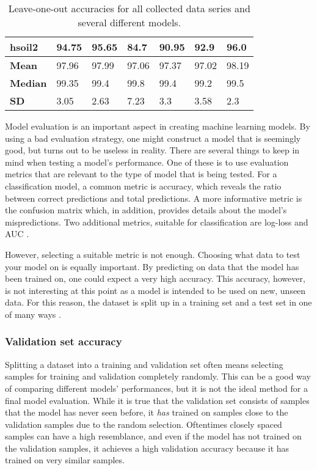 \begin{table}
\begin{center}
\begin{adjustbox}{totalheight=\baselineskip}
\begin{tabular}{|l|l|l|l|l|l|l|}
		hsoil2 & \cellcolor{red!20}94.75 & 95.65 & \cellcolor{red!20}84.7 & \cellcolor{red!20}90.95 & \cellcolor{red!20}92.9 & 96.0\\
		\hline
		\textbf{Mean} & 97.96 & 97.99 & 97.06 & 97.37 & 97.02 & \cellcolor{green!20}98.19\\
		\textbf{Median} & 99.35 & 99.4 &\cellcolor{green!20} 99.8 & 99.4 & 99.2 & 99.5\\
		\textbf{SD} & 3.05 & 2.63 & 7.23 & 3.3 & 3.58 & \cellcolor{green!20}2.3\\
		\hline
		\end{tabular}
	\end{adjustbox}
	\end{center}
	\label{tab:loo}
	\caption{Leave-one-out accuracies for all collected data series and several different models.}
\end{table}

Model evaluation is an important aspect in creating machine learning models. By using a bad evaluation strategy, one might construct a model that is seemingly good, but turns out to be useless in reality. There are several things to keep in mind when testing a model's performance. One of these is to use evaluation metrics that are relevant to the type of model that is being tested. For a classification model, a common metric is accuracy, which reveals the ratio between correct predictions and total predictions. A more informative metric is the confusion matrix which, in addition, provides details about the model's mispredictions. Two additional metrics, suitable for classification are log-loss and AUC \citep{zheng_2015}. 

However, selecting a suitable metric is not enough. Choosing what data to test your model on is equally important. By predicting on data that the model has been trained on, one could expect a very high accuracy. This accuracy, however, is not interesting at this point as a model is intended to be used on new, unseen data. For this reason, the dataset is split up in a training set and a test set in one of many ways \citep{raschka}.


\subsubsection{Validation set accuracy}
Splitting a dataset into a training and validation set often means selecting samples for training and validation completely randomly. This can be a good way of comparing different models' performances, but it is not the ideal method for a final model evaluation. While it is true that the validation set consists of samples that the model has never seen before, it \textit{has} trained on samples close to the validation samples due to the random selection. Oftentimes closely spaced samples can have a high resemblance, and even if the model has not trained on the validation samples, it achieves a high validation accuracy because it has trained on very similar samples.


